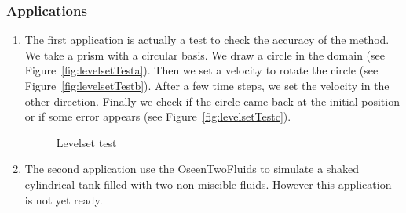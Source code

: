 \documentclass[11pt]{article}
\begin{document}
\subsubsection{Applications}
\begin{enumerate}
\item The first application is actually a test to check the accuracy of the method. We take a prism with a circular basis. We draw a circle in the domain (see Figure~\ref{fig:levelsetTesta}). Then we set a velocity to rotate the circle (see Figure~\ref{fig:levelsetTestb}). After a few time steps, we set the velocity in the other direction. Finally we check if the circle came back at the initial position or if some error appears  (see Figure~\ref{fig:levelsetTestc}).
\begin{figure}[H]
\centering
{}
\caption{Levelset test}
\label{fig:levelsetTest}
\end{figure}

\item The second application use the OseenTwoFluids to simulate a shaked cylindrical tank filled with two non-miscible fluids. However this application is not yet ready.
\end{enumerate}
\end{document}
